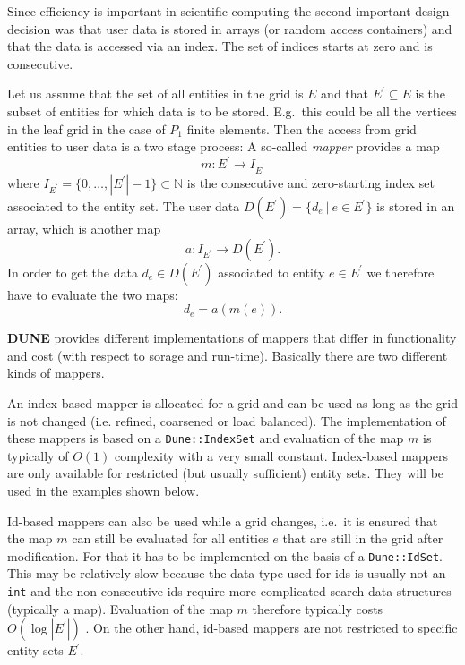\documentclass[11pt,a4paper,headinclude,footinclude,DIV16,normalheadings]{scrreprt}
\newcommand{\Dune}{{\sf\bfseries DUNE}\xspace}
\begin{document}
Since efficiency is important in scientific computing the second
important design decision was that user data is stored in arrays (or
random access containers) and that the data is accessed via an
index. The set of indices starts at zero and is consecutive. 

Let us assume that the set of all entities in the grid is $E$ and
that $E^\prime\subseteq E$ is the subset of entities for which data is
to be stored. E.g.~this could be all the vertices in the leaf grid in
the case of $P_1$ finite elements. Then the access from grid entities
to user data is a two stage process: A so-called \textit{mapper}
provides a map
\begin{equation}
m : E^\prime \to I_{E^\prime}
\end{equation}
where $I_{E^\prime}=\{0,\ldots,|E^\prime|-1\}\subset\mathbb{N}$ is the consecutive and
zero-starting index set associated to the entity set. The user data
$D(E^\prime)=\{d_e\ |\ e\in E^\prime\}$ is stored in an array, which
is another map
\begin{equation}
a : I_{E^\prime} \to D(E^\prime).
\end{equation}
In order to get the data $d_e\in D(E^\prime)$ associated to entity
$e\in E^\prime$ we therefore have to evaluate the two maps:
\begin{equation}
d_e = a(m(e)) .
\end{equation}

\Dune{} provides different implementations of mappers that differ in
functionality and cost (with respect to sorage and
run-time). Basically there are two different kinds of mappers. 


An index-based mapper is allocated for a grid and can be used as long
as the grid is not changed (i.e. refined, coarsened or load
balanced). The implementation of these mappers is based on a
\lstinline!Dune::IndexSet! and evaluation of the map $m$ is typically
of $O(1)$ complexity with a very small constant. 
Index-based mappers are only available for restricted (but
usually sufficient) entity sets. They will be used in the examples
shown below. 


Id-based mappers can also be used while a grid changes, i.e.~it is
ensured that the map $m$ can still be evaluated for all entities $e$
that are still in the grid after modification. For that it
has to be implemented on the basis of a \lstinline!Dune::IdSet!. This may be
relatively slow because the data type used for ids is usually not an
\lstinline!int! and the non-consecutive ids require more complicated search data
structures (typically a map). Evaluation of the map $m$ therefore
typically costs $O(\log |E^\prime|)$ . On the other hand, id-based
mappers are not restricted to specific entity sets $E^\prime$. 
\end{document}
